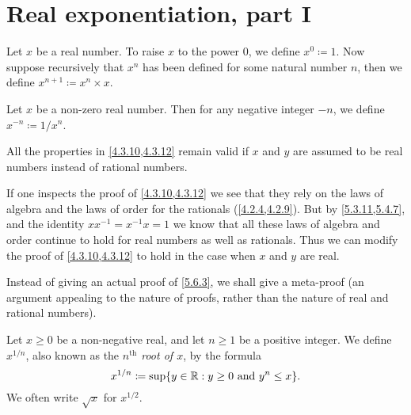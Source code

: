 \section{Real exponentiation, part I}\label{sec:5.6}

\begin{defn}\label{5.6.1}
  Let \(x\) be a real number.
  To raise \(x\) to the power \(0\), we define \(x^0 \coloneqq 1\).
  Now suppose recursively that \(x^n\) has been defined for some natural number \(n\), then we define \(x^{n + 1} \coloneqq x^n \times x\).
\end{defn}

\begin{defn}\label{5.6.2}
  Let \(x\) be a non-zero real number.
  Then for any negative integer \(-n\), we define \(x^{-n} \coloneqq 1 / x^n\).
\end{defn}

\begin{prop}\label{5.6.3}
  All the properties in \cref{4.3.10,4.3.12} remain valid if \(x\) and \(y\) are assumed to be real numbers instead of rational numbers.
\end{prop}

\begin{meta-proof}
If one inspects the proof of \cref{4.3.10,4.3.12} we see that they rely on the laws of algebra and the laws of order for the rationals (\cref{4.2.4,4.2.9}).
But by \cref{5.3.11,5.4.7}, and the identity \(xx^{-1} = x^{-1} x = 1\) we know that all these laws of algebra and order continue to hold for real numbers as well as rationals.
Thus we can modify the proof of \cref{4.3.10,4.3.12} to hold in the case when \(x\) and \(y\) are real.
\end{meta-proof}

\begin{note}
  Instead of giving an actual proof of \cref{5.6.3}, we shall give a meta-proof
  (an argument appealing to the nature of proofs, rather than the nature of real and rational numbers).
\end{note}

\begin{defn}\label{5.6.4}
  Let \(x \geq 0\) be a non-negative real, and let \(n \geq 1\) be a positive integer.
  We define \(x^{1 / n}\), also known as the \emph{\(n^{\text{th}}\) root of \(x\)}, by the formula
  \[
    x^{1 / n} \coloneqq \sup\set{y \in \R : y \geq 0 \text{ and } y^n \leq x}.
  \]
  We often write \(\sqrt{x}\) for \(x^{1 / 2}\).
\end{defn}

